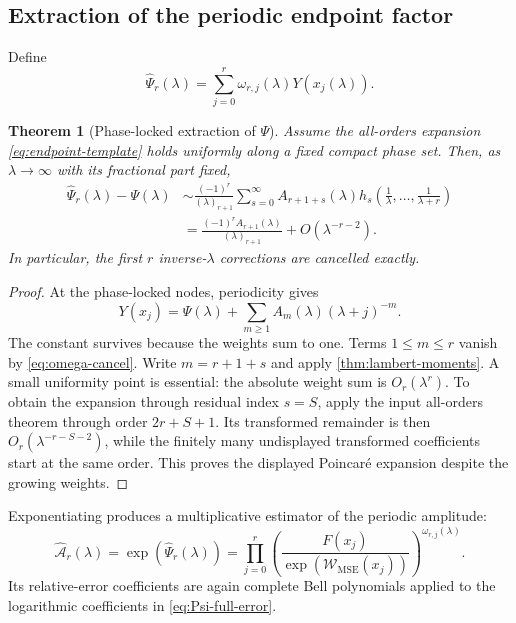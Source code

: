\documentclass[11pt]{article}
\newtheorem{theorem}{Theorem}[section]
\theoremstyle{definition}
\theoremstyle{remark}
\begin{document}
\subsection{Extraction of the periodic endpoint factor}

Define
\begin{equation}
\widehat\Psi_r(\lambda)
=\sum_{j=0}^{r}\omega_{r,j}(\lambda)Y(x_j(\lambda)).
\label{eq:Psi-hat}
\end{equation}

\begin{theorem}[Phase-locked extraction of $\Psi$]
\label{thm:Psi-extraction}
Assume the all-orders expansion \cref{eq:endpoint-template} holds uniformly along a fixed compact phase set. Then, as $\lambda\to\infty$ with its fractional part fixed,
\begin{align}
\widehat\Psi_r(\lambda)-\Psi(\lambda)
&\sim \frac{(-1)^r}{(\lambda)_{r+1}}
\sum_{s=0}^{\infty}A_{r+1+s}(\lambda)
 h_s\!\left(\frac1\lambda,\ldots,\frac1{\lambda+r}\right)
\label{eq:Psi-full-error}\\
&=\frac{(-1)^rA_{r+1}(\lambda)}{(\lambda)_{r+1}}
+O(\lambda^{-r-2}).
\label{eq:Psi-leading-error}
\end{align}
In particular, the first $r$ inverse-$\lambda$ corrections are cancelled exactly.
\end{theorem}

\begin{proof}
At the phase-locked nodes, periodicity gives
\[
Y(x_j)=\Psi(\lambda)+\sum_{m\ge1}A_m(\lambda)(\lambda+j)^{-m}.
\]
The constant survives because the weights sum to one. Terms $1\le m\le r$ vanish by \cref{eq:omega-cancel}. Write $m=r+1+s$ and apply \cref{thm:lambert-moments}. A small uniformity point is essential: the absolute weight sum is $O_r(\lambda^r)$. To obtain the expansion through residual index $s=S$, apply the input all-orders theorem through order $2r+S+1$. Its transformed remainder is then $O_r(\lambda^{-r-S-2})$, while the finitely many undisplayed transformed coefficients start at the same order. This proves the displayed Poincar\'e expansion despite the growing weights.
\end{proof}

Exponentiating produces a multiplicative estimator of the periodic amplitude:
\begin{equation}
\widehat{\mathcal A}_r(\lambda)
=\exp(\widehat\Psi_r(\lambda))
=\prod_{j=0}^{r}
\left(\frac{F(x_j)}{\exp(\mathcal W_{\mathrm{MSE}}(x_j))}
\right)^{\omega_{r,j}(\lambda)}.
\label{eq:Ahat}
\end{equation}
Its relative-error coefficients are again complete Bell polynomials applied to the logarithmic coefficients in \cref{eq:Psi-full-error}.
\end{document}
